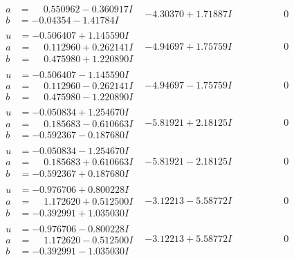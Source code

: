 \documentclass[1p]{elsarticle_modified}
\theoremstyle{definition}
\begin{document}
$$\begin{array}{c|c|c}
\begin{aligned}
a &= \phantom{-}0.550962 - 0.360917 I \\
b &= -0.04354 - 1.41784 I\end{aligned}
 & -4.30370 + 1.71887 I & \phantom{-0.000000 } 0 \\ \hline\begin{aligned}
u &= -0.506407 + 1.145590 I \\
a &= \phantom{-}0.112960 + 0.262141 I \\
b &= \phantom{-}0.475980 + 1.220890 I\end{aligned}
 & -4.94697 + 1.75759 I & \phantom{-0.000000 } 0 \\ \hline\begin{aligned}
u &= -0.506407 - 1.145590 I \\
a &= \phantom{-}0.112960 - 0.262141 I \\
b &= \phantom{-}0.475980 - 1.220890 I\end{aligned}
 & -4.94697 - 1.75759 I & \phantom{-0.000000 } 0 \\ \hline\begin{aligned}
u &= -0.050834 + 1.254670 I \\
a &= \phantom{-}0.185683 - 0.610663 I \\
b &= -0.592367 - 0.187680 I\end{aligned}
 & -5.81921 + 2.18125 I & \phantom{-0.000000 } 0 \\ \hline\begin{aligned}
u &= -0.050834 - 1.254670 I \\
a &= \phantom{-}0.185683 + 0.610663 I \\
b &= -0.592367 + 0.187680 I\end{aligned}
 & -5.81921 - 2.18125 I & \phantom{-0.000000 } 0 \\ \hline\begin{aligned}
u &= -0.976706 + 0.800228 I \\
a &= \phantom{-}1.172620 + 0.512500 I \\
b &= -0.392991 + 1.035030 I\end{aligned}
 & -3.12213 - 5.58772 I & \phantom{-0.000000 } 0 \\ \hline\begin{aligned}
u &= -0.976706 - 0.800228 I \\
a &= \phantom{-}1.172620 - 0.512500 I \\
b &= -0.392991 - 1.035030 I\end{aligned}
 & -3.12213 + 5.58772 I & \phantom{-0.000000 } 0 \\ \hline\begin{aligned}

\end{aligned}
\end{array}$$
\end{document}

